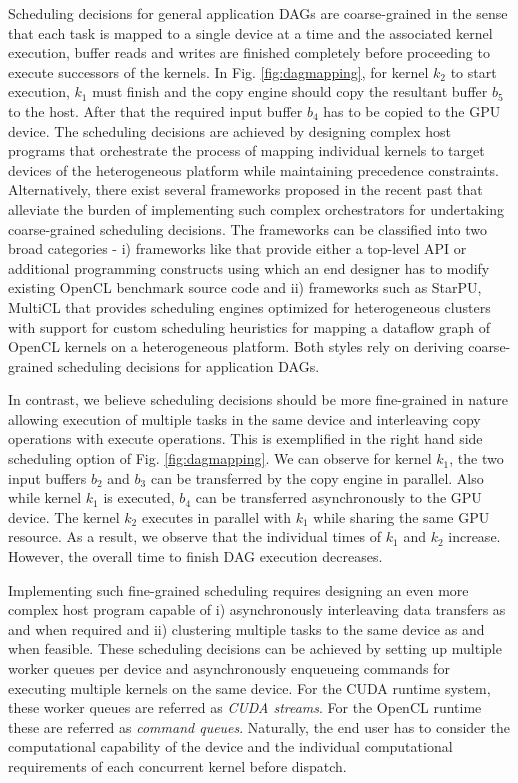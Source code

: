     Scheduling decisions for general application DAGs are coarse-grained in the sense that  each task is mapped to a single device at a time and the associated kernel execution, buffer reads and writes are finished completely before proceeding to execute successors of the kernels. In Fig. \ref{fig:dagmapping}, for kernel $k_2$ to start execution, $k_1$ must finish and the copy engine should copy the resultant buffer $b_5$ to the host. After that the required input buffer $b_4$ has to be copied to the GPU device. The scheduling decisions are achieved by designing complex host programs that orchestrate the process of mapping individual kernels to target devices of the heterogeneous platform while maintaining precedence constraints. Alternatively, there exist several frameworks proposed in the recent past that alleviate the burden of implementing such complex orchestrators for undertaking coarse-grained scheduling decisions. The frameworks can be classified into two broad categories - i) frameworks like \cite{pekka,henry2014toward} that provide either a top-level API or additional programming constructs using which an end designer has to modify existing OpenCL benchmark source code and ii) frameworks such as StarPU, MultiCL that provides scheduling engines  \cite{augonnet2011starpu,multicl} optimized for heterogeneous clusters with support for custom scheduling heuristics for mapping a dataflow graph of OpenCL kernels on a heterogeneous platform. Both styles rely on deriving coarse-grained scheduling decisions for application DAGs. 

    In contrast, we believe scheduling decisions should be more fine-grained in nature allowing execution of multiple tasks in the same device and interleaving copy operations with execute operations. This is exemplified in the right hand side scheduling option of Fig. \ref{fig:dagmapping}. We can observe for kernel $k_1$, the two input buffers $b_2$ and $b_3$ can be transferred by the copy engine in parallel. Also while kernel $k_1$ is executed,  $b_4$ can be transferred asynchronously to the GPU device. The kernel $k_2$ executes in parallel with $k_1$ while sharing the same GPU resource. As a result, we observe that the individual times of $k_1$ and $k_2$ increase. However, the overall time to finish DAG execution decreases. 

    Implementing such fine-grained scheduling requires designing an even more complex host program capable of  i) asynchronously interleaving data transfers as and when required and ii) clustering multiple tasks to the same device as and when feasible. These scheduling decisions can be achieved by setting up multiple worker queues per device and asynchronously enqueueing commands for executing multiple kernels on the same device. For the CUDA runtime system, these worker queues are referred as {\em CUDA streams}.  For the OpenCL runtime these are referred as {\em command queues}. Naturally, the end user has to consider the computational capability of the device and the individual computational requirements of each concurrent kernel before dispatch. 

